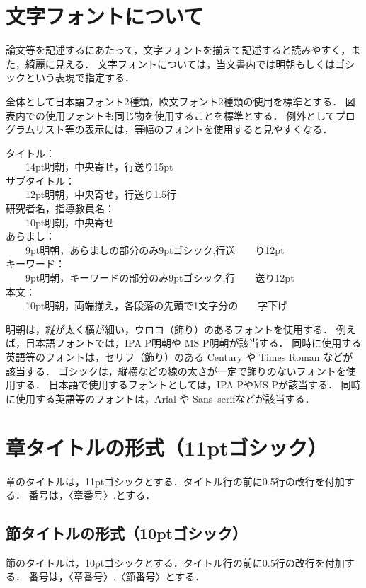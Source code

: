 \documentclass[twocolumn,fleqn]{jsarticle}
\begin{document}
\section{文字フォントについて}
論文等を記述するにあたって，文字フォントを揃えて記述すると読みやすく，また，綺麗に見える．
文字フォントについては，当文書内では明朝もしくはゴシックという表現で指定する．

全体として日本語フォント2種類，欧文フォント2種類の使用を標準とする．
図表内での使用フォントも同じ物を使用することを標準とする．
例外としてプログラムリスト等の表示には，等幅のフォントを使用すると見やすくなる．
\begin{flushleft}
タイトル：\\
　　14pt明朝，中央寄せ，行送り15pt\\
サブタイトル：\\
　　12pt明朝，中央寄せ，行送り1.5行\\
研究者名，指導教員名：\\
　　10pt明朝，中央寄せ\\
あらまし：\\
　　9pt明朝，あらましの部分のみ9ptゴシック,行送　　り12pt\\
キーワード：\\
　　9pt明朝，キーワードの部分のみ9ptゴシック,行　　送り12pt\\
本文：\\
　　10pt明朝，両端揃え，各段落の先頭で1文字分の　　字下げ
\end{flushleft}

明朝は，縦が太く横が細い，ウロコ（飾り）のあるフォントを使用する．
例えば，日本語フォントでは，IPA P明朝や MS P明朝が該当する．
同時に使用する英語等のフォントは，セリフ（飾り）のある Century や Times Roman などが該当する．
ゴシックは，縦横などの線の太さが一定で飾りのないフォントを使用する．
日本語で使用するフォントとしては，\textsf{IPA P}や\textsf{MS P}が該当する．
同時に使用する英語等のフォントは，\textsf{Arial} や \textsf{Sans--serif}などが該当する\cite{奥村}．

\section{章タイトルの形式（11ptゴシック）}
章のタイトルは，11ptゴシックとする．タイトル行の前に0.5行の改行を付加する．
番号は，〈章番号〉.とする．

\subsection{節タイトルの形式（10ptゴシック）}
節のタイトルは，10ptゴシックとする．タイトル行の前に0.5行の改行を付加する．
番号は，〈章番号〉.〈節番号〉とする．
\end{document}
